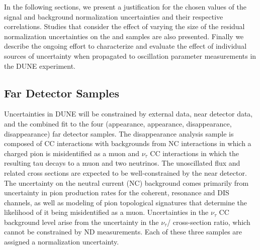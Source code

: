 In the following sections, we present a justification for the chosen values of the signal and background
normalization uncertainties and their respective correlations.
Studies that consider the effect of varying the size of the residual normalization
uncertainties on the \nue and \anue samples are also presented.
Finally we describe the ongoing effort to characterize and evaluate the effect of individual sources
of uncertainty when propagated to oscillation parameter measurements in the DUNE experiment.

\subsection{Far Detector Samples}
\label{sec:syst_just}
Uncertainties in DUNE will be constrained by external data, near detector data, and the combined
fit to the four (\nue appearance, \anue appearance, \numu disappearance, \anumu disappearance) far detector samples.
The \numu disappearance analysis sample is composed of \numu CC interactions with backgrounds from NC
interactions in which a charged pion is misidentified as a muon and $\nu_{\tau}$ CC interactions in which the resulting
tau decays to a muon and two neutrinos.
The unoscillated \numu flux and related cross sections are expected to be well-constrained by the near detector.
The uncertainty on the neutral current (NC) background comes primarily from uncertainty in pion production rates
for the coherent, resonance and DIS channels, as well as modeling of pion topological signatures that
determine the likelihood of it being misidentified as a muon.
Uncertainties in the $\nu_{\tau}$ CC background level arise from the uncertainty in the $\nu_{\tau}$/\numu
cross-section ratio, which cannot be constrained by ND measurements. Each of these three samples are
assigned a normalization uncertainty. 

